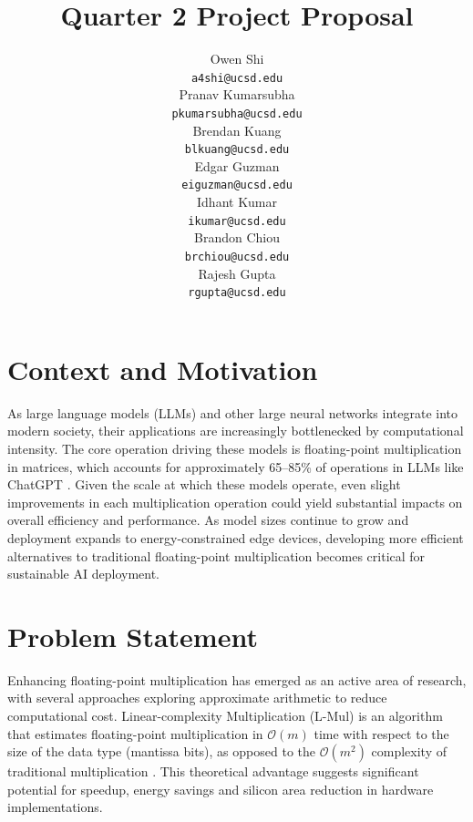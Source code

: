 \documentclass[12pt,letterpaper]{article}
\title{Quarter 2 Project Proposal}
\author{Owen Shi \\
  {\tt a4shi@ucsd.edu} \\\And
  Pranav Kumarsubha \\
  {\tt pkumarsubha@ucsd.edu} \\\And
  Brendan Kuang \\
  {\tt blkuang@ucsd.edu} \\\And
  Edgar Guzman \\
  {\tt eiguzman@ucsd.edu} \\\And
  Idhant Kumar \\
  {\tt ikumar@ucsd.edu} \\\And
  Brandon Chiou \\
  {\tt 	brchiou@ucsd.edu} \\\And
  Rajesh Gupta \\
  {\tt rgupta@ucsd.edu} \\}
\begin{document}
\maketitle


\maketoc
\clearpage


\section{Context and Motivation}

As large language models (LLMs) and other large neural networks integrate into modern society, their applications are increasingly bottlenecked by computational intensity. The core operation driving these models is floating-point multiplication in matrices, which accounts for approximately 65--85\% of operations in LLMs like ChatGPT \citep{dettmers2022llmint8}. Given the scale at which these models operate, even slight improvements in each multiplication operation could yield substantial impacts on overall efficiency and performance. As model sizes continue to grow and deployment expands to energy-constrained edge devices, developing more efficient alternatives to traditional floating-point multiplication becomes critical for sustainable AI deployment.

\section{Problem Statement}

Enhancing floating-point multiplication has emerged as an active area of research, with several approaches exploring approximate arithmetic to reduce computational cost. Linear-complexity Multiplication (L-Mul) is an algorithm that estimates floating-point multiplication in $\mathcal{O}(m)$ time with respect to the size of the data type (mantissa bits), as opposed to the $\mathcal{O}(m^2)$ complexity of traditional multiplication \citep{luo2024addition}. This theoretical advantage suggests significant potential for speedup, energy savings and silicon area reduction in hardware implementations.
\end{document}
